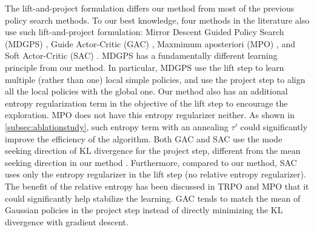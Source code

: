 The lift-and-project formulation differs our method from most of the previous policy search methods. 
To our best knowledge, four methods in the literature also use such lift-and-project formulation: Mirror Descent Guided Policy Search (MDGPS) \citep{montgomery2016guided}, Guide Actor-Critic (GAC) \citep{tangkaratt2017guide}, Maxmimum aposteriori (MPO) \citep{abdolmaleki2018maximum}, and Soft Actor-Critic (SAC) \citep{haarnoja2018soft}.
MDGPS \citep{montgomery2016guided} has a fundamentally different learning principle from our method. 
In particular, MDGPS use the lift step to learn multiple (rather than one) local simple policies, and use the project step to align all the local policies with the global one.
Our method also has an additional entropy regularization term in the objective of the lift step to encourage the exploration.
MPO \citep{abdolmaleki2018maximum} does not have this entropy regularizer neither. 
As shown in \cref{subsec:ablationstudy}, such entropy term with an annealing $\tau'$ could significantly improve the efficiency of the algorithm.
Both GAC and SAC use the mode seeking direction of KL divergence for the project step, different from the mean seeking direction in our method \citep{tangkaratt2017guide,haarnoja2018soft}. 
Furthermore, compared to our method, SAC uses only the entropy regularizer in the lift step (no relative entropy regularizer). 
The benefit of the relative entropy has been discussed in TRPO \citep{schulman2015trust} and MPO  \citep{abdolmaleki2018maximum} that it could significantly help stabilize the learning.
GAC tends to match the mean of Gaussian policies in the project step instead of directly minimizing the KL divergence with gradient descent.
